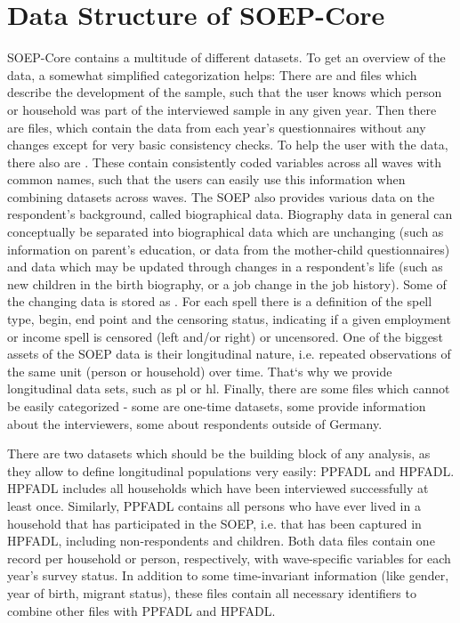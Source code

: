 \documentclass[letterpaper,10pt,openany,onesideH,english]{sphinxmanual}
\begin{document}
\section{Data Structure of SOEP-Core}
\label{\detokenize{Principles of Data Structure/index:data-structure-of-soep-core}}
SOEP-Core contains a multitude of different datasets. To get an overview of the data, a somewhat simplified categorization helps: There are {\hyperref[\detokenize{Principles of Data Structure/index:tracking-data}]{}} and {\hyperref[\detokenize{Principles of Data Structure/index:survey-data}]{}} files which describe the development of the sample, such that the user knows which person or household was part of the interviewed sample in any given year. Then there are {\hyperref[\detokenize{Principles of Data Structure/index:original-data}]{}} files, which contain the data from each year’s questionnaires without any changes except for very basic consistency checks. To help the user with the data, there also are {\hyperref[\detokenize{Principles of Data Structure/index:generated-data}]{}}. These contain consistently coded variables across all waves with common names, such that the users can easily use this information when combining datasets across waves. The SOEP also provides various data on the respondent’s background, called biographical data. Biography data in general can conceptually be separated into biographical data which are unchanging (such as information on parent’s education, or data from the mother-child questionnaires) and data which may be updated through changes in a respondent’s life (such as new children in the birth biography, or a job change in the job history). Some of the changing data is stored as {\hyperref[\detokenize{Principles of Data Structure/index:spell-data}]{}}. For each spell there is a definition of the spell type, begin, end point and the censoring status, indicating if a given employment or income spell is censored (left and/or right) or uncensored. One of the biggest assets of the SOEP data is their longitudinal nature, i.e. repeated observations of the same unit (person or household) over time. That{}`s why we provide longitudinal data sets, such as pl or hl. Finally, there are some files which cannot be easily categorized - some are one-time datasets, some provide information about the interviewers, some about respondents outside of Germany.

There are two datasets which should be the building block of any analysis, as they allow to define longitudinal populations very easily: PPFADL and HPFADL. HPFADL includes all households which have been interviewed successfully at least once. Similarly, PPFADL contains all persons who have ever lived in a household that has participated in the SOEP, i.e. that has been captured in HPFADL, including non-respondents and children. Both data files contain one record per household or person, respectively, with wave-specific variables for each year’s survey status. In addition to some time-invariant information (like gender, year of birth, migrant status), these files contain all necessary identifiers to combine other files with PPFADL and HPFADL.
\end{document}
